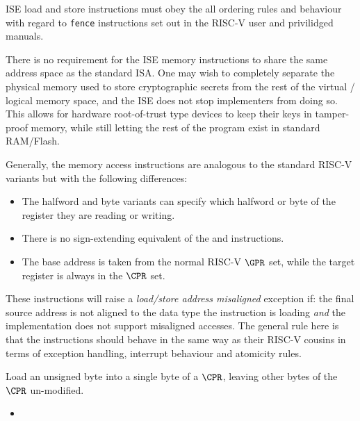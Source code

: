 ISE load and store instructions must obey the all ordering rules and
behaviour with regard to {\tt fence} instructions set out in the
RISC-V user and privilidged manuals.

There is no requirement for the ISE memory instructions to share the same
address space as the standard ISA. One may wish to completely separate
the physical memory used to store cryptographic secrets from the rest of
the virtual / logical memory space, and the ISE does not stop implementers
from doing so. This allows for hardware root-of-trust type devices to keep
their keys in tamper-proof memory, while still letting the rest of the
program exist in standard RAM/Flash.

Generally, the memory access instructions are analogous to
the standard RISC-V variants but with the following differences:

\begin{itemize}
\item The halfword and byte variants can specify which halfword or byte of
      the register they are reading or writing.
\item There is no sign-extending equivalent of the  and 
      instructions.
\item The base address is taken from the normal RISC-V $\GPR$ set, while the
      target register is always in the $\CPR$ set.
\end{itemize}

These instructions will raise a {\em load/store address misaligned} exception
if: the final source address is not aligned to the data type the instruction
is loading {\em and} the implementation does not support misaligned accesses.
The general rule here is that the  instructions should behave in
the same way as their RISC-V cousins in terms of exception handling,
interrupt behaviour and atomicity rules.


{\ienclbucr}
{
    Load an unsigned byte into a single byte of a $\CPR$, leaving other
    bytes of the $\CPR$ un-modified.
}{
\begin{itemize}
\item {}
\end{itemize}
}{}

